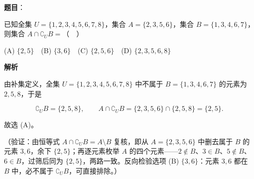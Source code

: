 \begin{answer}

\textbf{题目}：

已知全集 \(U=\{1,2,3,4,5,6,7,8\}\)，集合 \(A=\{2,3,5,6\}\)，集合 \(B=\{1,3,4,6,7\}\)，则集合 \(A\cap\complement_U B=\)（　）

(A) \(\{2,5\}\)　(B) \(\{3,6\}\)　(C) \(\{2,5,6\}\)　(D) \(\{2,3,5,6,8\}\)

\textbf{解析}

由补集定义，全集 \(U=\{1,2,3,4,5,6,7,8\}\) 中不属于 \(B=\{1,3,4,6,7\}\) 的元素为 \(2,5,8\)，于是

\nopagebreak[4]
\[
\complement_U B=\{2,5,8\},\qquad A\cap\complement_U B=\{2,3,5,6\}\cap\{2,5,8\}=\{2,5\}.
\]

故选 (A)。

（验证：由恒等式 \(A\cap\complement_U B=A\setminus B\) 复核，即从 \(A=\{2,3,5,6\}\) 中删去属于 \(B\) 的元素 \(3,6\)，余下 \(\{2,5\}\)；再逐元素枚举 \(A\) 的四个元素——\(2\notin B\)、\(3\in B\)、\(5\notin B\)、\(6\in B\)，过筛后同为 \(\{2,5\}\)，两路一致。反向检验选项 (B) \(\{3,6\}\)：元素 \(3,6\) 都在 \(B\) 中，必不属于 \(\complement_U B\)，可直接排除。）


\end{answer}
